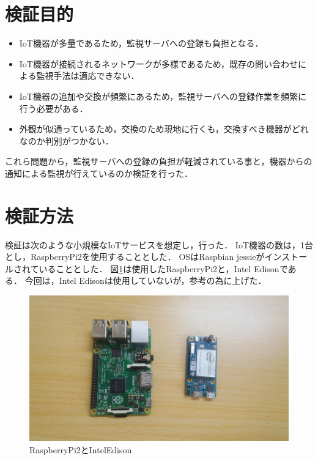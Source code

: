 \section{検証目的}
\begin{itemize}
\item IoT機器が多量であるため，監視サーバへの登録も負担となる．
\item IoT機器が接続されるネットワークが多様であるため，既存の問い合わせによる監視手法は適応できない．
\item IoT機器の追加や交換が頻繁にあるため，監視サーバへの登録作業を頻繁に行う必要がある．
\item 外観が似通っているため，交換のため現地に行くも，交換すべき機器がどれなのか判別がつかない．
\end{itemize}
これら問題から，監視サーバへの登録の負担が軽減されている事と，機器からの通知による監視が行えているのか検証を行った．

\section{検証方法}
検証は次のような小規模なIoTサービスを想定し，行った．
IoT機器の数は，1台とし，RaspberryPi2を使用することとした．
OSはRaspbian jessieがインストールされていることとした．
図\ref{fig:device}は使用したRaspberryPi2と，Intel Edisonである．
今回は，Intel Edisonは使用していないが，参考の為に上げた．
\begin{figure}[htbp]
\begin{center}
\includegraphics[width=14cm]{images/device.png}
\caption{RaspberryPi2とIntelEdison}
\label{fig:device}
\end{center}
\end{figure}

